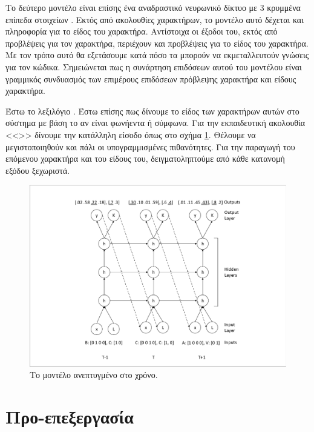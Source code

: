 Το δεύτερο μοντέλο είναι επίσης ένα αναδραστικό νευρωνικό δίκτυο με 3 κρυμμένα επίπεδα στοιχείων . 
Εκτός από ακολουθίες χαρακτήρων, το μοντέλο αυτό δέχεται και πληροφορία για το είδος του χαρακτήρα. 
Αντίστοιχα οι έξοδοι του, εκτός από προβλέψεις για τον χαρακτήρα, περιέχουν και προβλέψεις για το είδος του χαρακτήρα. Με τον τρόπο αυτό θα εξετάσουμε κατά πόσο τα  μπορούν να εκμεταλλευτούν  γνώσεις για τον κώδικα. Σημειώνεται πως η συνάρτηση επιδόσεων αυτού του μοντέλου είναι γραμμικός συνδυασμός των επιμέρους επιδόσεων πρόβλεψης χαρακτήρα και είδους χαρακτήρα.

Έστω το λεξιλόγιο .
Έστω επίσης πως δίνουμε το είδος των χαρακτήρων αυτών στο σύστημα με βάση το αν είναι φωνήεντα ή σύμφωνα.
Για την εκπαιδευτική ακολουθία  <<>> δίνουμε την κατάλληλη είσοδο όπως στο σχήμα \ref{fig:l-char-rnn}.
Θέλουμε να μεγιστοποιηθούν και πάλι οι υπογραμμισμένες πιθανότητες. Για την παραγωγή του επόμενου χαρακτήρα και του είδους του, δειγματοληπτούμε από κάθε κατανομή εξόδου ξεχωριστά.

\begin{figure}[h]
	\includegraphics[width=\textwidth, trim = 4 4 4 4, clip, keepaspectratio]{images/l-char-rnn.pdf}
	\centering 
	\caption{Το μοντέλο  ανεπτυγμένο στο χρόνο.}
	\label{fig:l-char-rnn}
\end{figure}

\section{Προ-επεξεργασία}

